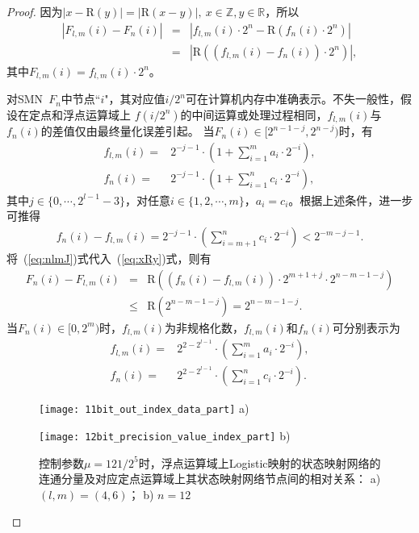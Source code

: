 \begin{proof}
因为$|x-\mathrm{R}(y)|= |\mathrm{R}(x-y)|,\ x\in \mathbb{Z}, y\in \mathbb{R}$，所以
\begin{eqnarray}
\left|F_{l,m}(i)-F_n(i)\right|
&=& \left|f_{l,m}(i) \cdot 2^{n}-\mathrm{R}\left(f_n(i) \cdot 2^{n}\right)\right|\nonumber\\
&=& \left| \mathrm{R}\left((f_{l,m}(i)-f_{n}(i))\cdot 2^{n}\right) \right|,
\label{eq:xRy}
\end{eqnarray}
其中$F_{l, m}(i)=f_{l,m}(i) \cdot 2^{n}$。

对SMN\ $F_{n}$中节点``$i$"，其对应值$i/2^n$可在计算机内存中准确表示。不失一般性，假设在定点和浮点运算域上
$f(i/2^n)$的中间运算或处理过程相同，$f_{l, m}(i)$与$f_{n}(i)$的差值仅由最终量化误差引起。
当$F_{n}(i)\in [2^{n-1-j}, 2^{n-j})$时，有
\begin{align}
f_{l, m}(i)       =&  2^{-j-1}\cdot \left(1+\sum_{i=1}^m a_i \cdot 2^{-i} \right),\\
f_{n}(i)          =&  2^{-j-1}\cdot \left(1+\sum_{i=1}^n c_i \cdot 2^{-i} \right),
\end{align}
其中$j\in \{0, \cdots, 2^{l-1}-3\}$，对任意$i\in \{1,2,\cdots,m\}$，$a_i=c_i$。根据上述条件，进一步可推得
\begin{align}
f_{n}(i)-f_{l, m}(i) = 2^{-j-1}\cdot \left( \sum_{i=m+1}^n c_i \cdot 2^{-i} \right) < 2^{-m-j-1}.
\label{eq:nlmJ}
\end{align}
将~(\ref{eq:nlmJ})式代入~(\ref{eq:xRy})式，则有
\begin{eqnarray}
F_n(i)- F_{l,m}(i)
& =   & \mathrm{R}\left( ( f_{n}(i)-f_{l,m}(i) )\cdot 2^{m+1+j}
                \cdot 2^{n-m-1-j}\right)\nonumber\\
& \le & \mathrm{R}\left(2^{n-m-1-j}\right)
= 2^{n-m-1-j}.
\end{eqnarray}
当$F_{n}(i)\in [0, 2^{m})$时，$f_{l,m}(i)$为非规格化数，$f_{l,m}(i)$和$f_{n}(i)$可分别表示为
\begin{align}
f_{l, m}(i)       =&  2^{2-2^{l-1}}\cdot \left( \sum_{i=1}^m a_i \cdot 2^{-i} \right),\\
f_{n}(i)          =&  2^{2-2^{l-1}}\cdot \left( \sum_{i=1}^n c_i \cdot 2^{-i} \right).
\end{align}

\begin{figure}[!htb]
\centering
\begin{minipage}{0.98\BigTwoImW}
\centering
\texttt{[image: 11bit\_out\_index\_data\_part]}
a)
\end{minipage}\hspace{\figsep}
\hspace{1mm}
\begin{minipage}{\BigTwoImW}
\centering
\texttt{[image: 12bit\_precision\_value\_index\_part]}
b)
\end{minipage}
\caption{控制参数$\mu=121/2^5$时，浮点运算域上Logistic映射的状态映射网络的连通分量及对应定点运算域上其状态映射网络节点间的相对关系：
a) $(l,m)=(4,6)$； b) $n=12$}
\label{fig:networklogistic12and11bits}
\end{figure}


\end{proof}

